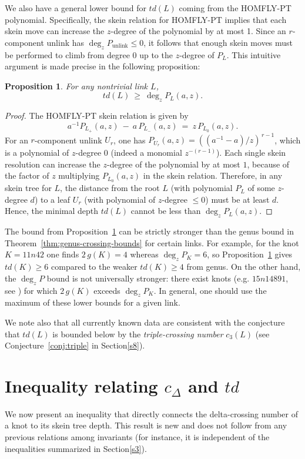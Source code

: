 \documentclass[pdftex, a4paper, 12pt, oneside]{amsart}
\numberwithin{equation}{section}
\theoremstyle{plain}
\newtheorem{proposition}[theorem]{Proposition}
\theoremstyle{definition}
\begin{document}
	We also have a general lower bound for $td(L)$ coming from the HOMFLY-PT polynomial. Specifically, the skein relation for HOMFLY-PT implies that each skein move can increase the $z$-degree of the polynomial by at most 1. Since an $r$-component unlink has $\deg_z P_{\text{unlink}} \le 0$, it follows that enough skein moves must be performed to climb from degree 0 up to the $z$-degree of $P_L$. This intuitive argument is made precise in the following proposition:
	
	\begin{proposition}\label{prop:degPz-bound}
		For any nontrivial link $L$, 
		\[ td(L)\ \ge\ \deg_z P_L(a,z). \]
	\end{proposition}
	
	\begin{proof}
		The HOMFLY-PT skein relation is given by 
		\[a^{-1} P_{L_+}(a,z)\ -\ a\,P_{L_-}(a,z)\ =\ z\,P_{L_0}(a,z).\] 
		For an $r$-component unlink $U_r$, one has $P_{U_r}(a,z) = ((a^{-1}-a)/z)^{\,r-1}$, which is a polynomial of $z$-degree $0$ (indeed a monomial $z^{-(r-1)}$). Each single skein resolution can increase the $z$-degree of the polynomial by at most $1$, because of the factor of $z$ multiplying $P_{L_0}(a,z)$ in the skein relation. Therefore, in any skein tree for $L$, the distance from the root $L$ (with polynomial $P_L$ of some $z$-degree $d$) to a leaf $U_r$ (with polynomial of $z$-degree $\le 0$) must be at least $d$. Hence, the minimal depth $td(L)$ cannot be less than $\deg_z P_L(a,z)$.
	\end{proof}
	
	The bound from Proposition~\ref{prop:degPz-bound} can be strictly stronger than the genus bound in Theorem~\ref{thm:genus-crossing-bounds} for certain links. For example, for the knot $K = 11{n42}$ one finds $2\,g(K) = 4$ whereas $\deg_z P_K = 6$, so Proposition~\ref{prop:degPz-bound} gives $td(K)\ge 6$ compared to the weaker $td(K)\ge 4$ from genus. On the other hand, the $\deg_z P$ bound is not universally stronger: there exist knots (e.g. $15{n14891}$, see \cite{Jab23}) for which $2\,g(K)$ exceeds $\deg_z P_K$. In general, one should use the maximum of these lower bounds for a given link. 
	
	We note also that all currently known data are consistent with the conjecture that $td(L)$ is bounded below by the \emph{triple-crossing number} $c_3(L)$ (see Conjecture~\ref{conj:triple} in Section\;\ref{s8}).
	
	\section{Inequality relating $c_{\Delta}$ and $td$}\label{s5}
	We now present an inequality that directly connects the delta-crossing number of a knot to its skein tree depth. This result is new and does not follow from any previous relations among invariants (for instance, it is independent of the inequalities summarized in Section\;\ref{s3}).
	
\end{document}
